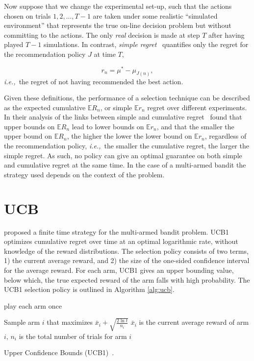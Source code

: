 \documentclass{kecsmstr}
\newcommand{\bE}{\mathbb{E}}
\newcommand{\ie}{{\it i.e.,}~}
\begin{document}
Now suppose that we change the experimental set-up, such that the actions chosen on trials $1, 2, \ldots, T-1$ are taken under some realistic ``simulated environment'' that represents the true on-line decision problem but without committing to the actions. The only \emph{real} decision is made at step $T$ after having played $T-1$ simulations. In contrast, \emph{simple regret}~ quantifies only the regret for the recommendation policy $J$ at time $T$,

\begin{equation}
r_n = \mu^* - \mu_{J(n)},
\end{equation}
\ie the regret of not having recommended the best action.

Given these definitions, the performance of a selection technique can be described as the expected cumulative $\bE R_n$, or simple $\bE r_n$ regret over different experiments. In their analysis of the links between simple and cumulative regret~ found that upper bounds on $\bE R_n$ lead to lower bounds on $\bE r_n$, and that the smaller the upper bound on $\bE R_n$, the higher the lower the lower bound on $\bE r_n$, regardless of the recommendation policy, \ie the smaller the cumulative regret, the larger the simple regret. As such, no policy can give an optimal guarantee on both simple and cumulative regret at the same time. In the case of a multi-armed bandit the strategy used depends on the context of the problem.

\section{UCB}
\label{sec:ucb}

 proposed a finite time strategy for the multi-armed bandit problem. UCB1 optimizes cumulative regret over time at an optimal logarithmic rate, without knowledge of the reward distributions. The selection policy consists of two terms, 1) the current average reward, and 2) the size of the one-sided confidence interval for the average reward. For each arm, UCB1 gives an upper bounding value, below which, the true expected reward of the arm falls with high probability. The UCB1 selection policy is outlined in Algorithm \ref{alg:ucb}.

\IncMargin{1em}
\begin{algorithm2e}[ht]
	\Indm
	\vspace{0.2cm}
	\Indp

	play each arm once 																				\;

	 {
		Sample arm $i$ that maximizes $\bar{x}_i + \displaystyle\sqrt{\frac{2\ln{t}}{n_i}}$ \newline
		$\bar{x}_i$ is the current average reward of arm $i$, $n_i$ is the total number of trials for arm $i$ \;
	}

  \caption[Upper Confidence Bounds (UCB1)]{Upper Confidence Bounds (UCB1)~\protect{}. \label{alg:ucb}}
\end{algorithm2e}
\DecMargin{1em}
\end{document}
